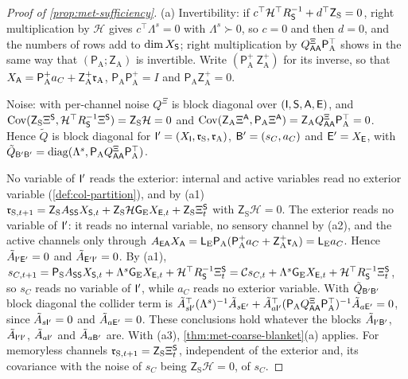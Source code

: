 \begin{proof}[Proof of \cref{prop:met-sufficiency}]
(a) Invertibility: if $c^\top\mathcal H^\top R_{\mathsf{S}}^{-1}+d^\top\mathsf Z_{\mathrm S}=0$, right multiplication by $\mathcal H$ gives $c^\top\Lambda^s=0$ with $\Lambda^s\succ0$, so $c=0$ and then $d=0$, and the numbers of rows add to $\dim X_{\mathsf{S}}$; right multiplication by $Q^{\Xi}_{\mathsf{A}\mathsf{A}}\mathsf P_{\mathrm A}^\top$ shows in the same way that $(\mathsf P_{\mathrm A};\mathsf Z_{\mathrm A})$ is invertible. Write $(\mathsf P_{\mathrm A}^+\ \mathsf Z_{\mathrm A}^+)$ for its inverse, so that $X_{\mathsf{A}}=\mathsf P_{\mathrm A}^+a_C+\mathsf Z_{\mathrm A}^+\mathfrak r_{\mathrm A}$, $\mathsf P_{\mathrm A}\mathsf P_{\mathrm A}^+=I$ and $\mathsf P_{\mathrm A}\mathsf Z_{\mathrm A}^+=0$.

Noise: with per-channel noise $Q^{\Xi}$ is block diagonal over $(\mathsf{I},\mathsf{S},\mathsf{A},\mathsf{E})$, and $\operatorname{Cov}(\mathsf Z_{\mathrm S}\Xi^{\mathsf{S}},\mathcal H^\top R_{\mathsf{S}}^{-1}\Xi^{\mathsf{S}})=\mathsf Z_{\mathrm S}\mathcal H=0$ and $\operatorname{Cov}(\mathsf Z_{\mathrm A}\Xi^{\mathsf{A}},\mathsf P_{\mathrm A}\Xi^{\mathsf{A}})=\mathsf Z_{\mathrm A}Q^{\Xi}_{\mathsf{A}\mathsf{A}}\mathsf P_{\mathrm A}^\top=0$. Hence $\tilde Q$ is block diagonal for $\mathsf{I}'=(X_{\mathsf{I}},\mathfrak r_{\mathrm S},\mathfrak r_{\mathrm A})$, $\mathsf{B}'=(s_C,a_C)$ and $\mathsf{E}'=X_{\mathsf{E}}$, with $\tilde Q_{\mathsf{B}'\mathsf{B}'}=\operatorname{diag}(\Lambda^s,\mathsf P_{\mathrm A}Q^{\Xi}_{\mathsf{A}\mathsf{A}}\mathsf P_{\mathrm A}^\top)$.

No variable of $\mathsf{I}'$ reads the exterior: internal and active variables read no exterior variable (\cref{def:col-partition}), and by (a1) $\mathfrak r_{\mathrm S,t+1}=\mathsf Z_{\mathrm S}A_{\mathsf{S}\mathsf{S}}X_{\mathsf{S},t}+\mathsf Z_{\mathrm S}\mathcal H\mathsf G_{\mathrm E}X_{\mathsf{E},t}+\mathsf Z_{\mathrm S}\Xi^{\mathsf{S}}_t$ with $\mathsf Z_{\mathrm S}\mathcal H=0$. The exterior reads no variable of $\mathsf{I}'$: it reads no internal variable, no sensory channel by (a2), and the active channels only through $A_{\mathsf{E}\mathsf{A}}X_{\mathsf{A}}=\mathsf L_{\mathrm E}\mathsf P_{\mathrm A}(\mathsf P_{\mathrm A}^+a_C+\mathsf Z_{\mathrm A}^+\mathfrak r_{\mathrm A})=\mathsf L_{\mathrm E}a_C$. Hence $\tilde A_{\mathsf{I}'\mathsf{E}'}=0$ and $\tilde A_{\mathsf{E}'\mathsf{I}'}=0$. By (a1), $s_{C,t+1}=\mathsf P_{\mathrm S}A_{\mathsf{S}\mathsf{S}}X_{\mathsf{S},t}+\Lambda^s\mathsf G_{\mathrm E}X_{\mathsf{E},t}+\mathcal H^\top R_{\mathsf{S}}^{-1}\Xi^{\mathsf{S}}_t=\mathcal Cs_{C,t}+\Lambda^s\mathsf G_{\mathrm E}X_{\mathsf{E},t}+\mathcal H^\top R_{\mathsf{S}}^{-1}\Xi^{\mathsf{S}}_t$, so $s_C$ reads no variable of $\mathsf{I}'$, while $a_C$ reads no exterior variable. With $\tilde Q_{\mathsf{B}'\mathsf{B}'}$ block diagonal the collider term is $\tilde A_{s\mathsf{I}'}^\top(\Lambda^s)^{-1}\tilde A_{s\mathsf{E}'}+\tilde A_{a\mathsf{I}'}^\top(\mathsf P_{\mathrm A}Q^{\Xi}_{\mathsf{A}\mathsf{A}}\mathsf P_{\mathrm A}^\top)^{-1}\tilde A_{a\mathsf{E}'}=0$, since $\tilde A_{s\mathsf{I}'}=0$ and $\tilde A_{a\mathsf{E}'}=0$. These conclusions hold whatever the blocks $\tilde A_{\mathsf{I}'\mathsf{B}'}$, $\tilde A_{\mathsf{I}'\mathsf{I}'}$, $\tilde A_{a\mathsf{I}'}$ and $\tilde A_{a\mathsf{B}'}$ are. With (a3), \cref{thm:met-coarse-blanket}(a) applies. For memoryless channels $\mathfrak r_{\mathrm S,t+1}=\mathsf Z_{\mathrm S}\Xi^{\mathsf{S}}_t$, independent of the exterior and, its covariance with the noise of $s_C$ being $\mathsf Z_{\mathrm S}\mathcal H=0$, of $s_C$.


\end{proof}
